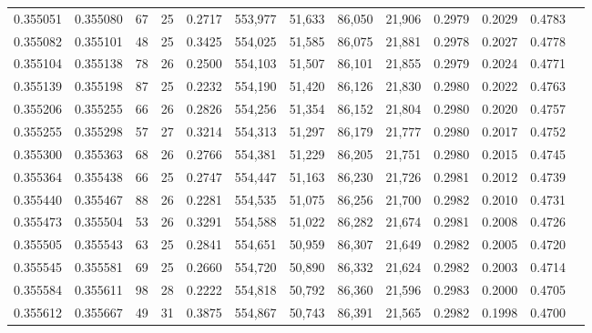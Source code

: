 \begin{tabular}{rrrrrrrrrrrrr}
0.355051 & 0.355080 &    67 &  25 &                                     0.2717 & 553,977 &  51,633 &  86,050 &  21,906 & 0.2979 & 0.2029 & 0.4783 \\
0.355082 & 0.355101 &    48 &  25 &                                     0.3425 & 554,025 &  51,585 &  86,075 &  21,881 & 0.2978 & 0.2027 & 0.4778 \\
0.355104 & 0.355138 &    78 &  26 &                                     0.2500 & 554,103 &  51,507 &  86,101 &  21,855 & 0.2979 & 0.2024 & 0.4771 \\
0.355139 & 0.355198 &    87 &  25 &                                     0.2232 & 554,190 &  51,420 &  86,126 &  21,830 & 0.2980 & 0.2022 & 0.4763 \\
0.355206 & 0.355255 &    66 &  26 &                                     0.2826 & 554,256 &  51,354 &  86,152 &  21,804 & 0.2980 & 0.2020 & 0.4757 \\
0.355255 & 0.355298 &    57 &  27 &                                     0.3214 & 554,313 &  51,297 &  86,179 &  21,777 & 0.2980 & 0.2017 & 0.4752 \\
0.355300 & 0.355363 &    68 &  26 &                                     0.2766 & 554,381 &  51,229 &  86,205 &  21,751 & 0.2980 & 0.2015 & 0.4745 \\
0.355364 & 0.355438 &    66 &  25 &                                     0.2747 & 554,447 &  51,163 &  86,230 &  21,726 & 0.2981 & 0.2012 & 0.4739 \\
0.355440 & 0.355467 &    88 &  26 &                                     0.2281 & 554,535 &  51,075 &  86,256 &  21,700 & 0.2982 & 0.2010 & 0.4731 \\
0.355473 & 0.355504 &    53 &  26 &                                     0.3291 & 554,588 &  51,022 &  86,282 &  21,674 & 0.2981 & 0.2008 & 0.4726 \\
0.355505 & 0.355543 &    63 &  25 &                                     0.2841 & 554,651 &  50,959 &  86,307 &  21,649 & 0.2982 & 0.2005 & 0.4720 \\
0.355545 & 0.355581 &    69 &  25 &                                     0.2660 & 554,720 &  50,890 &  86,332 &  21,624 & 0.2982 & 0.2003 & 0.4714 \\
0.355584 & 0.355611 &    98 &  28 &                                     0.2222 & 554,818 &  50,792 &  86,360 &  21,596 & 0.2983 & 0.2000 & 0.4705 \\
0.355612 & 0.355667 &    49 &  31 &                                     0.3875 & 554,867 &  50,743 &  86,391 &  21,565 & 0.2982 & 0.1998 & 0.4700 \\

\end{tabular}
